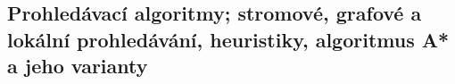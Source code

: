 \subsection{Prohledávací algoritmy; stromové, grafové a lokální prohledávání, heuristiky, algoritmus A* a jeho varianty}